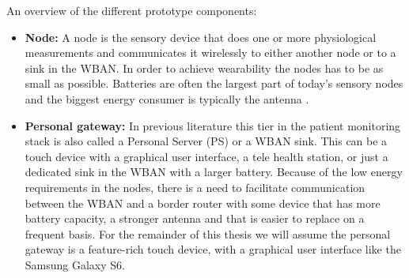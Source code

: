 \noindent
An overview of the different prototype components:
\begin{itemize}

  \item[] \textbf{Node:} A node is the sensory device that does one or more physiological measurements and communicates it wirelessly to either another node or to a sink in the WBAN. In order to achieve wearability the nodes has to be as small as possible. Batteries are often the largest part of today’s sensory nodes and the biggest energy consumer is typically the antenna \cite{Ullah:2010ci}.


  \item[] \textbf{Personal gateway:} In previous literature this tier in the patient monitoring stack is also called a Personal Server (PS) or a WBAN sink. This can be a touch device with a graphical user interface, a tele health station, or just a dedicated sink in the WBAN with a larger battery. Because of the low energy requirements in the nodes, there is a need to facilitate communication between the WBAN and a border router with some device that has more battery capacity, a stronger antenna and that is easier to replace on a frequent basis. For the remainder of this thesis we will assume the personal gateway is a feature-rich touch device, with a graphical user interface like the Samsung Galaxy S6.



\end{itemize}
